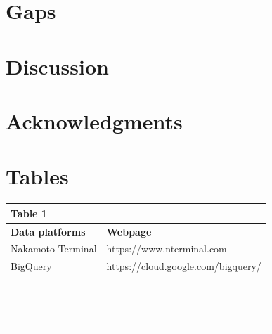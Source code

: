 \documentclass[english,12pt]{article}
\begin{document}
\section{Gaps}

\section{Discussion}


\newpage
\section{Acknowledgments}


\newpage



\newpage

\section{Tables}
\begin{center}
\begin{tabular}{  p{5cm}  |  p{13cm} }
\hline
Table 1 & \textbf{}\\  \hline
  \textbf{Data platforms} & \textbf{Webpage}\\  \hline
        Nakamoto Terminal & https://www.nterminal.com \\ \hline
        BigQuery & https://cloud.google.com/bigquery/ \\ \hline
         & \\ \hline
         & \\ \hline
         & \\ \hline        
         & \\ \hline
         & \\ \hline 
         & \\ \hline        
         & \\ \hline
         & \\ \hline
         & \\ \hline
         & \\ \hline
         & \\ \hline
         & \\ \hline
         & \\ \hline
         & \\ \hline
        
\bottomrule
\end{tabular}
\end{center}
\end{document}
